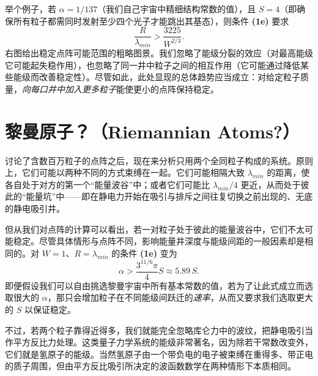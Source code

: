 
举个例子，若 $\alpha=1/137$（我们自己宇宙中精细结构常数的值），且 $S=4$（即确保所有粒子都需同时发射至少四个光子才能跳出其基态），则条件 \textbf{(1e)} 要求
\begin{equation}
\frac{R}{\lambda_{min}}>\frac{3225}{W^{2/3}}.
\end{equation}
右图给出稳定点阵可能范围的粗略图景。我们忽略了能级分裂的效应（对最高能级它可能起失稳作用），也忽略了同一井中粒子之间的相互作用（它可能通过降低某些能级而改善稳定性）。尽管如此，此处显现的总体趋势应当成立：对给定粒子质量，\emph{向每口井中加入更多粒子}能使更小的点阵保持稳定。

\section{黎曼原子？（Riemannian Atoms?）}

讨论了含数百万粒子的点阵之后，现在来分析只用两个全同粒子构成的系统。原则上，它们可能以两种不同的方式束缚在一起。它们可能相隔大致 $\lambda_{min}$ 的距离，使各自处于对方的第一个“能量波谷”中；或者它们可能比 $\lambda_{min}/4$ 更近，从而处于彼此的“能量坑”中——即在静电力开始在吸引与排斥之间往复切换之前出现的、无底的静电吸引井。

但从我们对点阵的计算可以看出，若一对粒子处于彼此的能量波谷中，它们不太可能稳定。尽管具体情形与点阵不同，影响能量井深度与能级间距的一般因素却是相同的。对 $W=1$、$R=\lambda_{min}$ 的条件 \textbf{(1e)} 变为
\begin{equation}
\alpha>\frac{3^{11/6}\pi}{4}S\approx 5.89\,S .
\end{equation}
即便假设我们可以自由挑选黎曼宇宙中所有基本常数的值，若为了让此式成立而选取很大的 $\alpha$，那只会增加粒子在不同能级间跃迁的\emph{速率}，从而又要求我们选取更大的 $S$ 以保证稳定。

不过，若两个粒子靠得近得多，我们就能完全忽略库仑力中的波纹，把静电吸引当作平方反比力处理。这类量子力学系统的能级非常著名，因为除若干常数改变外，它们就是氢原子的能级。当然氢原子由一个带负电的电子被束缚在重得多、带正电的质子周围，但由平方反比吸引所决定的波函数数学在两种情形下本质相同。

